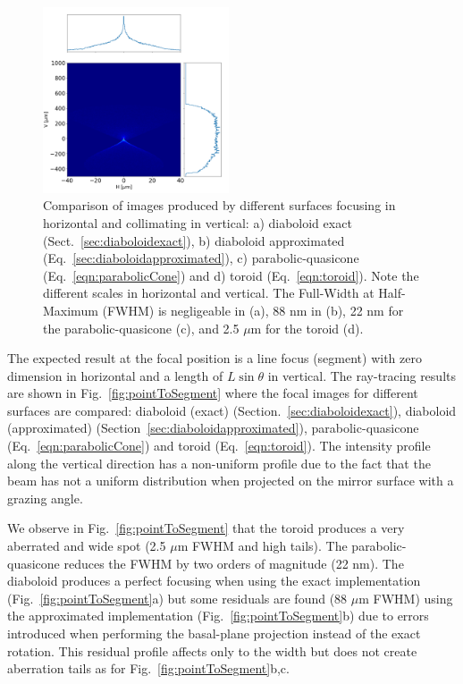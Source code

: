 \documentclass{iucr}              %
\newcommand{\inred}[1]{{\color{red}#1}}
\begin{document}
\begin{figure}
\includegraphics[width=0.49\textwidth]{figures/p2s_toroid_z.png}
\caption{Comparison of images produced by different surfaces focusing in horizontal and collimating in vertical: a) diaboloid exact (Sect.~\ref{sec:diaboloidexact}), b) diaboloid approximated (Eq.~\ref{sec:diaboloidapproximated}), c) parabolic-quasicone (Eq.~\ref{eqn:parabolicCone}) and d) toroid (Eq.~\ref{eqn:toroid}). \inred{Note the different scales in horizontal and vertical. The Full-Width at Half-Maximum (FWHM) is negligeable in (a), 88 nm in (b), 22 nm for the parabolic-quasicone (c), and 2.5 $\mu$m for the toroid (d).}
}
\end{figure}

The expected result at the focal position is a line focus (segment) with zero dimension in horizontal and a length of $L\sin\theta$ in vertical. The ray-tracing results are shown in Fig.~\ref{fig:pointToSegment} where the focal images for different surfaces are compared: diaboloid (exact) (Section.~\ref{sec:diaboloidexact}), diaboloid (approximated) (Section~\ref{sec:diaboloidapproximated}), parabolic-quasicone (Eq.~\ref{eqn:parabolicCone}) and toroid (Eq.~\ref{eqn:toroid}). The intensity profile along the vertical direction has a non-uniform profile due to the fact that the beam has not a uniform distribution when projected on the mirror surface with a grazing angle.

We observe in Fig.~\ref{fig:pointToSegment} that the toroid produces a very aberrated and wide spot (2.5 $\mu$m FWHM and high tails). The parabolic-quasicone reduces the FWHM by two orders of magnitude (22 nm). The diaboloid produces a perfect focusing when using the exact implementation (Fig.~\ref{fig:pointToSegment}a) but some 
residuals are found (88 $\mu$m FWHM) using the approximated implementation (Fig.~\ref{fig:pointToSegment}b) due to errors introduced when performing the basal-plane projection instead of the exact rotation. This residual profile affects only to the width but does not create aberration tails as for Fig.~\ref{fig:pointToSegment}b,c.  
\end{document}
